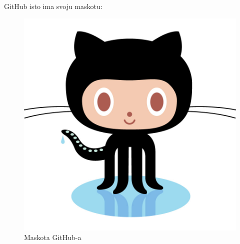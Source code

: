 \documentclass{article}
\begin{document}
	GitHub isto ima svoju maskotu:
	\begin{figure}[h!]
		\begin{center}
			\includegraphics[scale=0.15]{macka.png}
			\caption{Maskota GitHub-a}
		\end{center}
	\end{figure}
\end{document}
